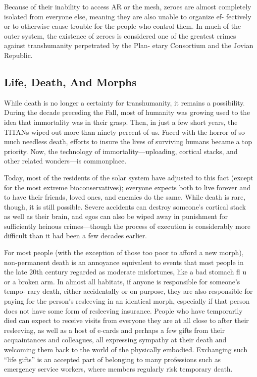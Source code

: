 Because of their inability to access AR or the mesh, 
zeroes are almost completely isolated from everyone 
else, meaning they are also unable to organize ef-
fectively or to otherwise cause trouble for the people 
who control them. In much of the outer system, the 
existence of zeroes is considered one of the greatest 
crimes against transhumanity perpetrated by the Plan-
etary Consortium and the Jovian Republic.

\subsection{Life, Death, And Morphs}

While death is no longer a certainty for transhumanity, 
it remains a possibility. During the decade preceding 
the Fall, most of humanity was growing used to the 
idea that immortality was in their grasp. Then, in just 
a few short years, the TITANs wiped out more than 
ninety percent of us. Faced with the horror of so much 
needless death, efforts to insure the lives of surviving 
humans became a top priority. Now, the technology 
of immortality—uploading, cortical stacks, and other 
related wonders—is commonplace.

Today, most of the residents of the solar system 
have adjusted to this fact (except for the most extreme 
bioconservatives); everyone expects both to live forever 
and to have their friends, loved ones, and enemies do 
the same. While death is rare, though, it is still possible. 
Severe accidents can destroy someone's cortical stack 
as well as their brain, and egos can also be wiped away 
in punishment for sufficiently heinous crimes—though 
the process of execution is considerably more difficult 
than it had been a few decades earlier.

For most people (with the exception of those too 
poor to afford a new morph), non-permanent death is 
an annoyance equivalent to events that most people in 
the late 20th century regarded as moderate misfortunes, 
like a bad stomach fl u or a broken arm. In almost all 
habitats, if anyone is responsible for someone's tempo-
rary death, either accidentally or on purpose, they are 
also responsible for paying for the person's resleeving 
in an identical morph, especially if that person does not 
have some form of resleeving insurance. People who 
have temporarily died can expect to receive visits from 
everyone they are at all close to after their resleeving, 
as well as a host of e-cards and perhaps a few gifts 
from their acquaintances and colleagues, all expressing 
sympathy at their death and welcoming them back to 
the world of the physically embodied. Exchanging such 
``life gifts'' is an accepted part of belonging to many 
professions such as emergency service workers, where 
members regularly risk temporary death.

